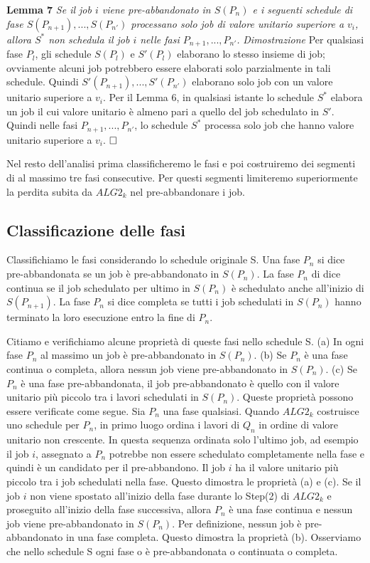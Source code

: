 \documentclass[12pt]{article}
\begin{document}
\textbf{Lemma 7}
\textit{Se il job $i$ viene pre-abbandonato in $S(P_{n})$ e i seguenti schedule di fase $S(P_{n + 1}), . . . , S(P_{n'})$ processano solo job di valore unitario superiore a $v_{i}$, allora $S^{*}$ non schedula il job $i$ nelle fasi $P_{n + 1}, . . . , P_{n'}$.}
\newline \newline
\textit{Dimostrazione}
Per qualsiasi fase $P_{l}$, gli schedule $S(P_{l})$ e $S'(P_{l})$ elaborano lo stesso insieme di job; ovviamente alcuni job potrebbero essere elaborati solo parzialmente in tali schedule. Quindi $S'(P_{n + 1}), . . . , S'(P_{n'})$ elaborano solo job con un valore unitario superiore a $v_{i}$. Per il Lemma 6, in qualsiasi istante lo schedule $S^*$ elabora un job il cui valore unitario è almeno pari a quello del job schedulato in $S'$. Quindi nelle fasi $P_{n + 1}, . . . , P_{n'}$, lo schedule $S^{*}$ processa solo job che hanno valore unitario superiore a $v_{i}$. $\hfill \square$

Nel resto dell'analisi prima classificheremo le fasi e poi costruiremo dei segmenti di al massimo tre fasi consecutive. Per questi segmenti limiteremo superiormente la perdita subita da $ALG2_{k}$ nel pre-abbandonare i job.

\subsection{Classificazione delle fasi}
Classifichiamo le fasi considerando lo schedule originale S. Una fase $P_{n}$ si dice pre-abbandonata se un job è pre-abbandonato in $S(P_{n})$. La fase $P_{n}$ di dice continua se il job schedulato per ultimo in $S(P_{n})$ è schedulato anche all'inizio di $S(P_{n + 1})$. La fase $P_{n}$ si dice completa se tutti i job schedulati in $S(P_{n})$ hanno terminato la loro esecuzione entro la fine di $P_{n}$. 

Citiamo e verifichiamo alcune proprietà di queste fasi nello schedule S. (a) In ogni fase $P_{n}$ al massimo un job è pre-abbandonato in $S(P_{n})$. 
(b) Se $P_{n}$ è una fase continua o completa, allora nessun job viene pre-abbandonato in $S(P_{n})$. 
(c) Se $P_{n}$ è una fase pre-abbandonata, il job pre-abbandonato è quello con il valore unitario più piccolo tra i lavori schedulati in $S(P_{n})$. Queste proprietà possono essere verificate come segue. Sia $P_{n}$ una fase qualsiasi. Quando $ALG2_{k}$ costruisce uno schedule per $P_{n}$, in primo luogo ordina i lavori di $Q_{n}$ in ordine di valore unitario non crescente. In questa sequenza ordinata solo l'ultimo job, ad esempio il job $i$, assegnato a $P_{n}$ potrebbe non essere schedulato completamente nella fase e quindi è un candidato per il pre-abbandono. Il job $i$ ha il valore unitario più piccolo tra i job schedulati nella fase. Questo dimostra le proprietà (a) e (c). Se il job $i$ non viene spostato all'inizio della fase durante lo Step(2) di $ALG2_{k}$ e proseguito all'inizio della fase successiva, allora $P_{n}$ è una fase continua e nessun job viene pre-abbandonato in $S(P_{n})$. Per definizione, nessun job è pre-abbandonato in una fase completa. Questo dimostra la proprietà (b). Osserviamo che nello schedule S ogni fase o è pre-abbandonata o continuata o completa.
\end{document}
